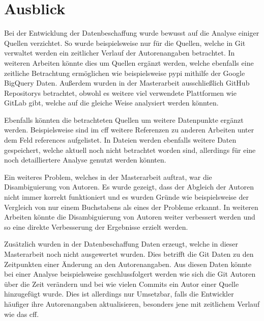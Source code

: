 \section{Ausblick}
\label{sec:ausblick}
Bei der Entwicklung der Datenbeschaffung wurde bewusst auf die Analyse einiger Quellen verzichtet.
So wurde beispielsweise nur für die Quellen, welche in Git verwaltet werden ein zeitlicher Verlauf der Autorenangaben betrachtet.
In weiteren Arbeiten könnte dies um Quellen ergänzt werden, welche ebenfalls eine zeitliche Betrachtung ermöglichen wie beispielsweise \gls{pypi} mithilfe der Google BigQuery Daten.
Außerdem wurden in der Masterarbeit ausschließlich GitHub Repositorys betrachtet, obwohl es weitere viel verwendete Plattformen wie GitLab gibt, welche auf die gleiche Weise analysiert werden könnten.

Ebenfalls könnten die betrachteten Quellen um weitere Datenpunkte ergänzt werden.
Beispielsweise sind im \gls{cff} weitere Referenzen zu anderen Arbeiten unter dem Feld \glqq references\grqq{} aufgelistet.
In  Dateien werden ebenfalls weitere Daten gespeichert, welche aktuell noch nicht betrachtet worden sind, allerdings für eine noch detailliertere Analyse genutzt werden könnten.

Ein weiteres Problem, welches in der Masterarbeit auftrat, war die Disambiguierung von Autoren.
Es wurde gezeigt, dass der Abgleich der Autoren nicht immer korrekt funktioniert und es wurden Gründe wie beispielsweise der Vergleich von nur einem Buchstabens als eines der Probleme erkannt.
In weiteren Arbeiten könnte die Disambiguierung von Autoren weiter verbessert werden und so eine direkte Verbesserung der Ergebnisse erzielt werden.

Zusätzlich wurden in der Datenbeschaffung Daten erzeugt, welche in dieser Masterarbeit noch nicht ausgewertet wurden.
Dies betrifft die Git Daten zu den Zeitpunkten einer Änderung an den Autorenangaben.
Aus diesen Daten könnte bei einer Analyse beispielsweise geschlussfolgert werden wie sich die Git Autoren über die Zeit verändern und bei wie vielen Commits ein Autor einer Quelle hinzugefügt wurde.
Dies ist allerdings nur Umsetzbar, falls die Entwickler häufiger ihre Autorenangaben aktualisieren, besonders jene mit zeitlichem Verlauf wie das \gls{cff}.
